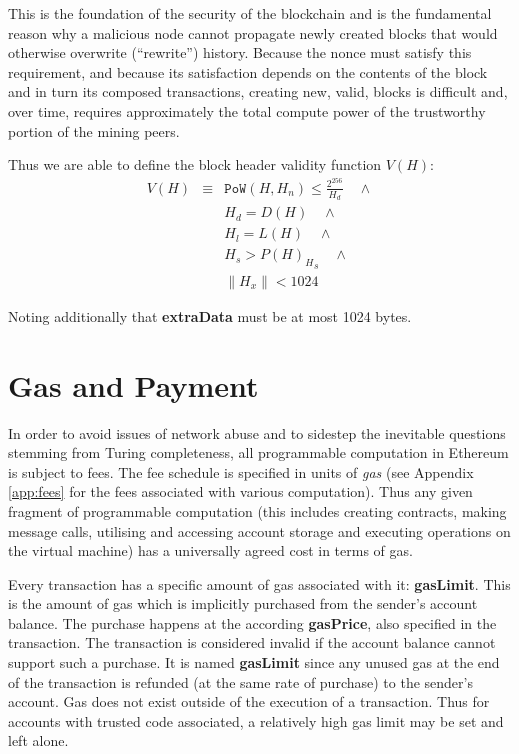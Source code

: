 \documentclass[9pt,oneside]{amsart}
\begin{document}
\begin{multicols}{2}
This is the foundation of the security of the blockchain and is the fundamental reason why a malicious node cannot propagate newly created blocks that would otherwise overwrite (``rewrite'') history. Because the nonce must satisfy this requirement, and because its satisfaction depends on the contents of the block and in turn its composed transactions, creating new, valid, blocks is difficult and, over time, requires approximately the total compute power of the trustworthy portion of the mining peers.

Thus we are able to define the block header validity function $V(H)$:
\begin{eqnarray}
V(H) & \equiv & \mathtt{PoW}(H, H_n) \leqslant \frac{2^{256}}{H_d} \quad \wedge \\
& & H_d = D(H) \quad \wedge \\
& & H_l = L(H) \quad \wedge \\
& & H_s > {P(H)_H}_s \quad \wedge \\
& & \lVert H_x \rVert < 1024
\end{eqnarray}

Noting additionally that \textbf{extraData} must be at most 1024 bytes.

\section{Gas and Payment} \label{ch:payment}

In order to avoid issues of network abuse and to sidestep the inevitable questions stemming from Turing completeness, all programmable computation in Ethereum is subject to fees. The fee schedule is specified in units of \textit{gas} (see Appendix \ref{app:fees} for the fees associated with various computation). Thus any given fragment of programmable computation (this includes creating contracts, making message calls, utilising and accessing account storage and executing operations on the virtual machine) has a universally agreed cost in terms of gas.

Every transaction has a specific amount of gas associated with it: \textbf{gasLimit}. This is the amount of gas which is implicitly purchased from the sender's account balance. The purchase happens at the according \textbf{gasPrice}, also specified in the transaction. The transaction is considered invalid if the account balance cannot support such a purchase. It is named \textbf{gasLimit} since any unused gas at the end of the transaction is refunded (at the same rate of purchase) to the sender's account. Gas does not exist outside of the execution of a transaction. Thus for accounts with trusted code associated, a relatively high gas limit may be set and left alone.


\end{multicols}
\end{document}
